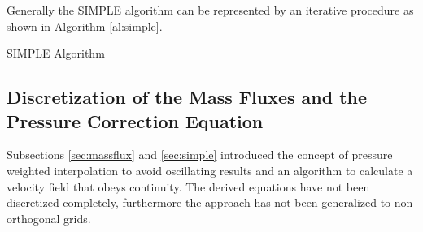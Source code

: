  Generally the SIMPLE algorithm can be represented by an iterative procedure as shown in Algorithm \ref{al:simple}.
\begin{algorithm}
\label{al:simple}
\caption{SIMPLE Algorithm}
\begin{algorithmic}
  \EndIf
\EndWhile
\end{algorithmic}
\end{algorithm}

  \subsection{Discretization of the Mass Fluxes and the Pressure Correction Equation}
  \label{sec:segpresscorr}

  Subsections \ref{sec:massflux} and \ref{sec:simple} introduced the concept of pressure weighted interpolation to avoid oscillating results and an algorithm to calculate a velocity field that obeys continuity. The derived equations have not been discretized completely, furthermore the approach has not been generalized to non-orthogonal grids.

